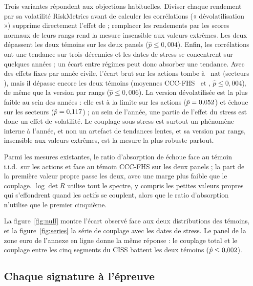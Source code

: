 \documentclass[12pt]{article}
\theoremstyle{definition}
\begin{document}
\begin{doublespace}
Trois variantes répondent aux objections habituelles. Diviser chaque
rendement par sa volatilité RiskMetrics avant de calculer les corrélations
(« dévolatilisation ») supprime directement l'effet de \citet{forbes2002} ;
remplacer les rendements par les scores normaux de leurs rangs rend la mesure
insensible aux valeurs extrêmes. Les deux dépassent les deux témoins sur les
deux panels ($\hat p\le0{,}004$). Enfin, les corrélations ont une tendance sur
trois décennies et les dates de stress se concentrent sur quelques années ;
un écart entre régimes peut donc absorber une tendance. Avec des effets fixes
par année civile, l'écart brut sur les actions tombe à \gnSpFeObs~nat
(secteurs \gnFfFeObs), mais il dépasse encore les deux témoins (moyennes
CCC-FHS \gnSpFeNull\ et \gnFfFeNull, $\hat p\le0{,}004$), de même que la
version par rangs ($\hat p\le0{,}006$). La version dévolatilisée est la plus
faible au sein des années : elle est à la limite sur les actions
($\hat p=0{,}052$) et échoue sur les secteurs ($\hat p=0{,}117$) ;
au sein de l'année, une partie de l'effet du stress est donc un effet de
volatilité. Le couplage sous stress est surtout un phénomène interne à
l'année, et non un artefact de tendances lentes, et sa version par rangs,
insensible aux valeurs extrêmes, est la mesure la plus robuste partout.

Parmi les mesures existantes, le ratio d'absorption de \citet{kritzman2011}
échoue face au témoin i.i.d.\ sur les actions et face au témoin CCC-FHS sur
les deux panels ; la part de la première valeur propre passe les deux, avec
une marge plus faible que le couplage. $\log\det R$ utilise tout le spectre, y
compris les petites valeurs propres qui s'effondrent quand les actifs se
couplent, alors que le ratio d'absorption n'utilise que le premier cinquième.

La figure~\ref{fig:null} montre l'écart observé face aux deux distributions
des témoins, et la figure~\ref{fig:series} la série de couplage avec les dates
de stress. Le panel de la zone euro de l'annexe en ligne donne la même
réponse : le couplage total et le couplage entre les cinq segments du CISS
battent les deux témoins ($\hat p\le0{,}002$).

\subsection{Chaque signature à l'épreuve}


\end{doublespace}
\end{document}
